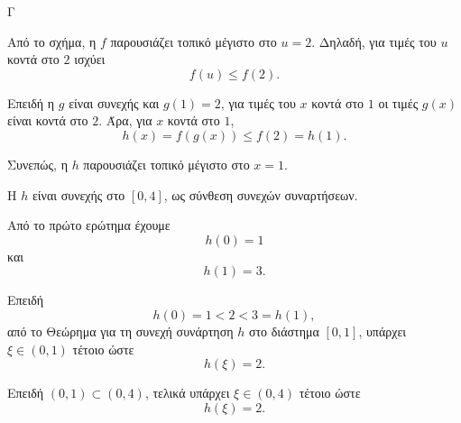 \begin{thema}{Γ}
\begin{erwthma}
\item Από το σχήμα, η $f$ παρουσιάζει τοπικό μέγιστο στο $u=2$. Δηλαδή, για τιμές του $u$ κοντά στο $2$ ισχύει
\[
f(u)\leq f(2).
\]

Επειδή η $g$ είναι συνεχής και $g(1)=2$, για τιμές του $x$ κοντά στο $1$ οι τιμές $g(x)$ είναι κοντά στο $2$. Άρα, για $x$ κοντά στο $1$,
\[
h(x)=f(g(x))\leq f(2)=h(1).
\]

Συνεπώς, η $h$ παρουσιάζει τοπικό μέγιστο στο $x=1$.

\item Η $h$ είναι συνεχής στο $[0,4]$, ως σύνθεση συνεχών συναρτήσεων.

Από το πρώτο ερώτημα έχουμε
\[
h(0)=1
\]
και
\[
h(1)=3.
\]

Επειδή
\[
h(0)=1<2<3=h(1),
\]
από το Θεώρημα  για τη συνεχή συνάρτηση $h$ στο διάστημα $[0,1]$, υπάρχει $\xi\in(0,1)$ τέτοιο ώστε
\[
h(\xi)=2.
\]

Επειδή $(0,1)\subset(0,4)$, τελικά υπάρχει $\xi\in(0,4)$ τέτοιο ώστε
\[
h(\xi)=2.
\]
\end{erwthma}
\end{thema}



